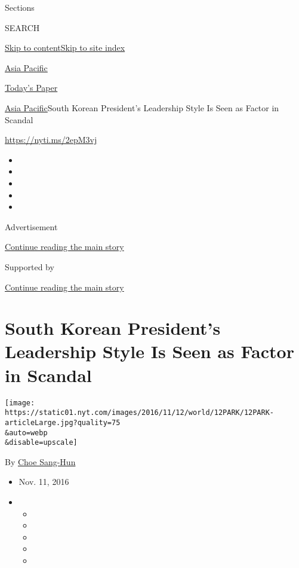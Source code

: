 Sections

SEARCH

\protect\hyperlink{site-content}{Skip to
content}\protect\hyperlink{site-index}{Skip to site index}

\href{https://www.nytimes.com/section/world/asia}{Asia Pacific}

\href{https://myaccount.nytimes.com/auth/login?response_type=cookie\&client_id=vi}{}

\href{https://www.nytimes.com/section/todayspaper}{Today's Paper}

\href{/section/world/asia}{Asia Pacific}\textbar{}South Korean
President's Leadership Style Is Seen as Factor in Scandal

\url{https://nyti.ms/2epM3vj}

\begin{itemize}
\item
\item
\item
\item
\item
\end{itemize}

Advertisement

\protect\hyperlink{after-top}{Continue reading the main story}

Supported by

\protect\hyperlink{after-sponsor}{Continue reading the main story}

\hypertarget{south-korean-presidents-leadership-style-is-seen-as-factor-in-scandal}{%
\section{South Korean President's Leadership Style Is Seen as Factor in
Scandal}\label{south-korean-presidents-leadership-style-is-seen-as-factor-in-scandal}}

\texttt{[image: https://static01.nyt.com/images/2016/11/12/world/12PARK/12PARK-articleLarge.jpg?quality=75\\\&auto=webp\\\&disable=upscale]}

By \href{http://www.nytimes.com/by/choe-sang-hun}{Choe Sang-Hun}

\begin{itemize}
\item
  Nov. 11, 2016
\item
  \begin{itemize}
  \item
  \item
  \item
  \item
  \item
  \end{itemize}
\end{itemize}

